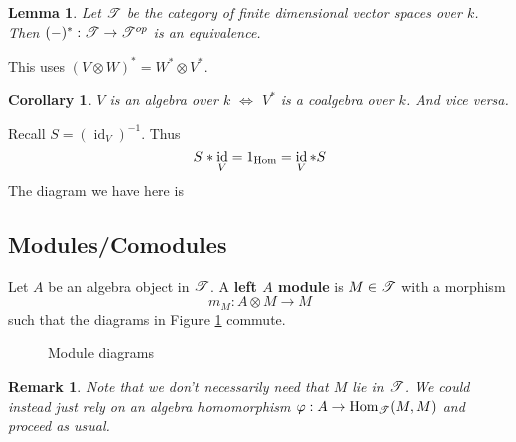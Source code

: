 \documentclass[12pt]{article}
\theoremstyle{break}
\theoremstyle{nonumberbreak}
\theoremstyle{changebreak}
\newtheorem{lem}[thm]{Lemma}
\newtheorem{cor}[thm]{Corollary}
\theoremstyle{break}
\theoremstyle{nonumberbreak}
\theoremstyle{nonumberplain}
\theoremstyle{change}
\newtheorem{rmk}[thm]{Remark}
\DeclareMathOperator{\id}{id}
\newcommand*{\Hom}{\ensuremath\text{Hom}}
\newcommand*{\scrT}{\ensuremath\mathscr{T}}
\begin{document}
 \begin{lem}
	Let $\scrT$ be the category of finite dimensional vector spaces over $k$.
	Then $(-)^*:\scrT\to\scrT^{op}$ is an equivalence.
 \end{lem}
 This uses $(V\otimes W)^*=W^*\otimes V^*$.
 \begin{cor}
	$V$ is an algebra over $k$ $\Leftrightarrow$ $V^*$ is a coalgebra over $k$.
	And vice versa.
 \end{cor}

 Recall $S=(\id_V)^{-1}$. Thus
 \[S\ast \id_V=1_{\Hom}=\id_V\ast S\]
 The diagram we have here is
 \begin{figure}[h]
	 \centering
 \end{figure}

 \subsection*{Modules/Comodules}
 \begin{defn}
	Let $A$ be an algebra object in $\scrT$. A \textbf{left $A$ module} is $M\in\scrT$
	with a morphism
	\[m_M:A\otimes M\to M\]
	such that the diagrams in Figure \ref{fig-mod} commute.
\end{defn}
\begin{figure}[h]\label{fig-mod}
	\centering
	\caption{Module diagrams}
\end{figure}
\begin{rmk}
	Note that we don't necessarily need that $M$ lie in $\scrT$. We could instead just 
	rely on an algebra homomorphism $\varphi:A\to \Hom_{\scrT}(M,M)$ and proceed as usual.
\end{rmk}
\end{document}
